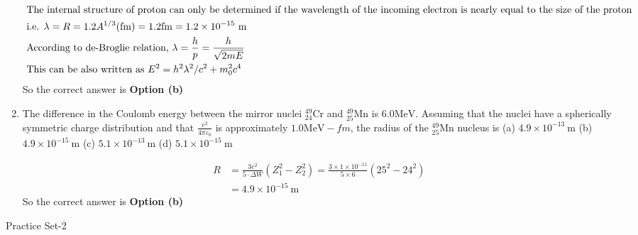\begin{enumerate}
\begin{tasks}
	\end{tasks}
\begin{answer}
	\begin{align*}
	\intertext{ The internal structure of proton can only be determined if the wavelength of the incoming electron is nearly equal to the size of the proton}
&\text{	i.e. $\lambda=R=1.2 A^{1 / 3}(\mathrm{fm})=1.2 \mathrm{fm}=1.2 \times 10^{-15} \mathrm{~m}$}\\
	&\text { According to de-Broglie relation, } \lambda=\frac{h}{p}=\frac{h}{\sqrt{2 m E}}\\
&\text { This can be also written as } E^2=h^2 \lambda^2 / c^2+m_0^2 c^4
	\end{align*}
	So the correct answer is \textbf{Option (b)}
\end{answer}
	\item  The difference in the Coulomb energy between the mirror nuclei ${ }_{24}^{49} \mathrm{Cr}$ and ${ }_{25}^{49} \mathrm{Mn}$ is $6.0 \mathrm{MeV}$. Assuming that the nuclei have a spherically symmetric charge distribution and that $\frac{e^2}{4 \pi \varepsilon_0}$ is approximately $1.0 \mathrm{MeV}-f m$, the radius of the ${ }_{25}^{49} \mathrm{Mn}$ nucleus is
	(a) $4.9 \times 10^{-13} \mathrm{~m}$
	(b) $4.9 \times 10^{-15} \mathrm{~m}$
	(c) $5.1 \times 10^{-13} \mathrm{~m}$
	(d) $5.1 \times 10^{-15} \mathrm{~m}$
	\begin{answer}
		\begin{align*}
		R&=\frac{3 e^2}{5 \cdot \Delta W}\left(Z_1^2-Z_2^2\right)=\frac{3 \times 1 \times 10^{-15}}{5 \times 6}\left(25^2-24^2\right)\\
		&=4.9 \times 10^{-15} \mathrm{~m}
		\end{align*}
			So the correct answer is \textbf{Option (b)}
	\end{answer}
\end{enumerate}
\newpage
\begin{abox}
	Practice Set-2
\end{abox}
